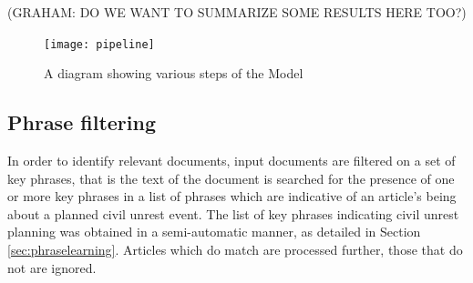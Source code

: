 (GRAHAM: DO WE WANT TO SUMMARIZE SOME RESULTS HERE TOO?)

%

%



\begin{figure}
\texttt{[image: pipeline]}
\caption{A diagram showing various steps of the Model}
\end{figure}

\subsection{Phrase filtering}

In order to identify relevant documents, input documents are filtered on a set of key phrases, that is 
the text of the document is searched for the presence of one or
more key phrases in a list of phrases which are indicative of an article's being
about a planned civil unrest event.  
The list of key phrases indicating civil unrest planning was obtained
in a semi-automatic manner, as detailed in Section \ref{sec:phraselearning}.
Articles which do match are processed further, those that do not are ignored.

